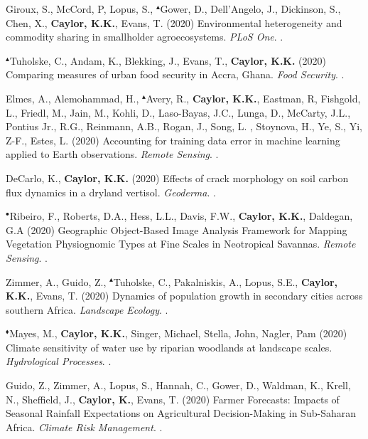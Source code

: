 \begin{etaremune}
\item Giroux, S., McCord, P, Lopus, S., $^{\blacktriangle}$Gower, D., Dell'Angelo, J., Dickinson, S., Chen, X., \textbf{ Caylor, K.K.}, Evans, T. (2020) Environmental heterogeneity and commodity sharing in smallholder agroecosystems. \emph{PLoS One}. .
\item $^{\blacktriangle}$Tuholske, C., Andam, K., Blekking, J., Evans, T., \textbf{ Caylor, K.K.} (2020) Comparing measures of urban food security in Accra, Ghana. \emph{Food Security}. .
\item Elmes, A., Alemohammad, H., $^{\blacktriangle}$Avery, R., \textbf{ Caylor, K.K.}, Eastman, R, Fishgold, L., Friedl, M., Jain, M., Kohli, D., Laso-Bayas, J.C., Lunga, D., McCarty, J.L., Pontius Jr., R.G., Reinmann, A.B., Rogan, J., Song, L. , Stoynova, H., Ye, S., Yi, Z-F., Estes, L. (2020) Accounting for training data error in machine learning applied to Earth observations. \emph{Remote Sensing}. .
\item DeCarlo, K., \textbf{ Caylor, K.K.} (2020) Effects of crack morphology on soil carbon flux dynamics in a dryland vertisol. \emph{Geoderma}. .
\item $^{\bullet}$Ribeiro, F., Roberts, D.A., Hess, L.L., Davis, F.W., \textbf{ Caylor, K.K.}, Daldegan, G.A (2020) Geographic Object-Based Image Analysis Framework for Mapping Vegetation Physiognomic Types at Fine Scales in Neotropical Savannas. \emph{Remote Sensing}. .
\item Zimmer, A., Guido, Z., $^{\blacktriangle}$Tuholske, C., Pakalniskis, A., Lopus, S.E., \textbf{ Caylor, K.K.}, Evans, T. (2020) Dynamics of population growth in secondary cities across southern Africa. \emph{Landscape Ecology}. .
\item $^{\blacklozenge}$Mayes, M., \textbf{ Caylor, K.K.}, Singer, Michael, Stella, John, Nagler, Pam (2020) Climate sensitivity of water use by riparian woodlands at landscape scales. \emph{Hydrological Processes}. .
\item Guido, Z., Zimmer, A., Lopus, S., Hannah, C., Gower, D., Waldman, K., Krell, N., Sheffield, J., \textbf{ Caylor, K.}, Evans, T. (2020) Farmer Forecasts: Impacts of Seasonal Rainfall Expectations on Agricultural Decision-Making in Sub-Saharan Africa. \emph{Climate Risk Management}. .


\end{etaremune}
